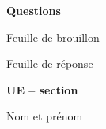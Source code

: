 \documentclass[12pt,french,a4paper,oneside]{article}
\newcommand{\thesubtitle}{UE -- section} %
\begin{document}
\begin{examcopy}[2]
	\clearpage{}


	\textbf{\Large{}Questions}

	\vspace{1em}




	\clearpage{}

	\begin{center}
		{\large{Feuille de brouillon}}
	\end{center}

	\clearpage{}

	\AMCformBegin{}

	\begin{center}\Large Feuille de réponse\end{center}

	{\bf \thetitle{}\hspace*{\fill}\thesubtitle{}}

	\vspace{1em}

	Nom et prénom \\
	\namefield{\fbox{\begin{minipage}{\linewidth}%
				\vspace{1cm}\namefielddots{}%
				\vspace*{1mm}%
			\end{minipage}}}

	\vspace{1em}


	\AMCform{}
	\clearpage{}

\end{examcopy}
\end{document}

